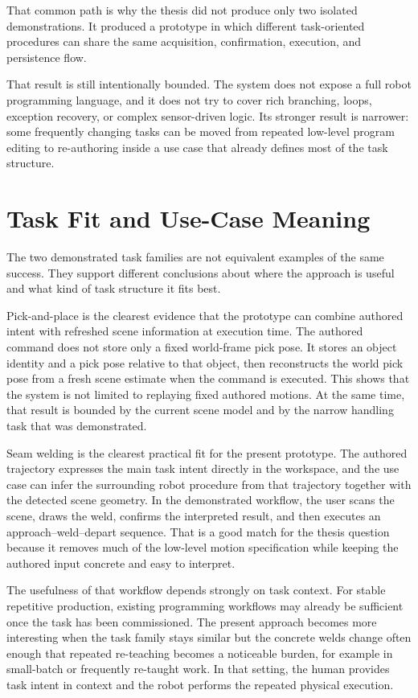 That common path is why the thesis did not produce only two isolated demonstrations. It produced a prototype in which different task-oriented procedures can share the same acquisition, confirmation, execution, and persistence flow.

That result is still intentionally bounded. The system does not expose a full robot programming language, and it does not try to cover rich branching, loops, exception recovery, or complex sensor-driven logic. Its stronger result is narrower: some frequently changing tasks can be moved from repeated low-level program editing to re-authoring inside a use case that already defines most of the task structure.

\section{Task Fit and Use-Case Meaning}

The two demonstrated task families are not equivalent examples of the same success. They support different conclusions about where the approach is useful and what kind of task structure it fits best.

Pick-and-place is the clearest evidence that the prototype can combine authored intent with refreshed scene information at execution time. The authored command does not store only a fixed world-frame pick pose. It stores an object identity and a pick pose relative to that object, then reconstructs the world pick pose from a fresh scene estimate when the command is executed. This shows that the system is not limited to replaying fixed authored motions. At the same time, that result is bounded by the current scene model and by the narrow handling task that was demonstrated.

Seam welding is the clearest practical fit for the present prototype. The authored trajectory expresses the main task intent directly in the workspace, and the use case can infer the surrounding robot procedure from that trajectory together with the detected scene geometry. In the demonstrated workflow, the user scans the scene, draws the weld, confirms the interpreted result, and then executes an approach--weld--depart sequence. That is a good match for the thesis question because it removes much of the low-level motion specification while keeping the authored input concrete and easy to interpret.

The usefulness of that workflow depends strongly on task context. For stable repetitive production, existing programming workflows may already be sufficient once the task has been commissioned. The present approach becomes more interesting when the task family stays similar but the concrete welds change often enough that repeated re-teaching becomes a noticeable burden, for example in small-batch or frequently re-taught work. In that setting, the human provides task intent in context and the robot performs the repeated physical execution.


